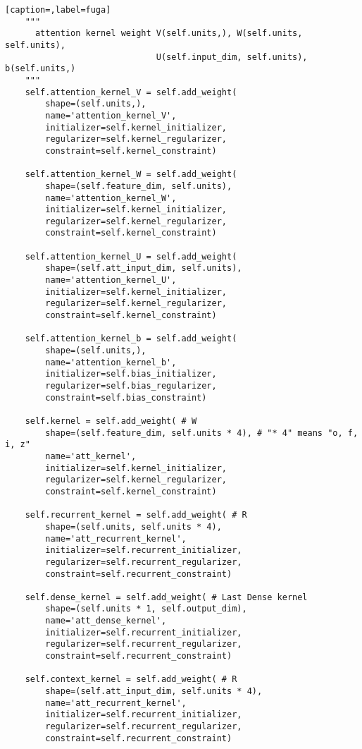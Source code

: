 \begin{lstlisting}[caption=,label=fuga]
    """
      attention kernel weight V(self.units,), W(self.units, self.units),
                              U(self.input_dim, self.units), b(self.units,)
    """
    self.attention_kernel_V = self.add_weight(
        shape=(self.units,),
        name='attention_kernel_V',
        initializer=self.kernel_initializer,
        regularizer=self.kernel_regularizer,
        constraint=self.kernel_constraint)

    self.attention_kernel_W = self.add_weight(
        shape=(self.feature_dim, self.units),
        name='attention_kernel_W',
        initializer=self.kernel_initializer,
        regularizer=self.kernel_regularizer,
        constraint=self.kernel_constraint)

    self.attention_kernel_U = self.add_weight(
        shape=(self.att_input_dim, self.units),
        name='attention_kernel_U',
        initializer=self.kernel_initializer,
        regularizer=self.kernel_regularizer,
        constraint=self.kernel_constraint)

    self.attention_kernel_b = self.add_weight(
        shape=(self.units,),
        name='attention_kernel_b',
        initializer=self.bias_initializer,
        regularizer=self.bias_regularizer,
        constraint=self.bias_constraint)

    self.kernel = self.add_weight( # W
        shape=(self.feature_dim, self.units * 4), # "* 4" means "o, f, i, z"
        name='att_kernel',
        initializer=self.kernel_initializer,
        regularizer=self.kernel_regularizer,
        constraint=self.kernel_constraint)

    self.recurrent_kernel = self.add_weight( # R
        shape=(self.units, self.units * 4),
        name='att_recurrent_kernel',
        initializer=self.recurrent_initializer,
        regularizer=self.recurrent_regularizer,
        constraint=self.recurrent_constraint)

    self.dense_kernel = self.add_weight( # Last Dense kernel
        shape=(self.units * 1, self.output_dim),
        name='att_dense_kernel',
        initializer=self.recurrent_initializer,
        regularizer=self.recurrent_regularizer,
        constraint=self.recurrent_constraint)

    self.context_kernel = self.add_weight( # R
        shape=(self.att_input_dim, self.units * 4),
        name='att_recurrent_kernel',
        initializer=self.recurrent_initializer,
        regularizer=self.recurrent_regularizer,
        constraint=self.recurrent_constraint)


\end{lstlisting}

